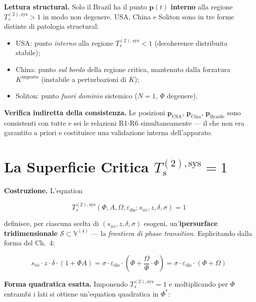 \Hypoth{} \textbf{Lettura structural.} Solo il Brazil ha il punto
\(\boldsymbol{p}(t)\) \textbf{interno} alla regione
\(T_s^{(2),\text{sys}} > 1\) in modo non degenere. USA, China e Soliton
sono in tre forme distinte di patologia structural:

\begin{itemize}
\tightlist
\item
  USA: punto \emph{interno} alla regione \(T_s^{(2),\text{sys}} < 1\)
  (decoherence distribuita stabile);
\item
  China: punto \emph{sul bordo} della regione critica, mantenuto dalla
  forzatura \(K^{\text{imposto}}\) (instabile a perturbazioni di \(K\));
\item
  Soliton: punto \emph{fuori dominio} sistemico (\(N=1\), \(\Phi\)
  degenere).
\end{itemize}

\Proved{} \textbf{Verifica indiretta della consistenza.} Le posizioni
\(\boldsymbol{p}_{\text{USA}}\), \(\boldsymbol{p}_{\text{Cina}}\),
\(\boldsymbol{p}_{\text{Brasile}}\) sono consistenti con tutte e sei le
relazioni R1-R6 simultaneamente --- il che non era garantito a priori e
costituisce una validazione interna dell'apparato.



\section{\texorpdfstring{La Superficie Critica
\(T_s^{(2),\text{sys}} = 1\)}{La Superficie Critica T\_s\^{}\{(2),\textbackslash text\{sys\}\} = 1}}\label{la-superficie-critica-t_s2textsys-1}

\Hypoth{} \textbf{Costruzione.} L'equation

\[
T_s^{(2),\text{sys}}(\Phi, A, \Omega, \varepsilon_{\text{dis}}; s_{iii}, z, \delta, \sigma) = 1
\]

definisce, per ciascuna scelta di \((s_{iii}, z, \delta, \sigma)\)
esogeni, un'\textbf{ipersurface tridimensionale}
\(\mathcal{S} \subset \mathbb{V}^{(4)}\) --- la \emph{frontiera di
phase transition}. Esplicitando dalla forma del Ch.~4:

\[
s_{iii} \cdot z \cdot \delta \cdot (1 + \Phi A) = \sigma \cdot \varepsilon_{\text{dis}} \cdot \left(\Phi + \frac{\Omega}{\Phi} \cdot \Phi\right) = \sigma \cdot \varepsilon_{\text{dis}} \cdot (\Phi + \Omega)
\]

\Hypoth{} \textbf{Forma quadratica esatta.} Imponendo
\(T_s^{(2),\text{sys}} = 1\) e moltiplicando per \(\Phi\) entrambi i
lati si ottiene un'equation quadratica in \(\Phi^*\):

